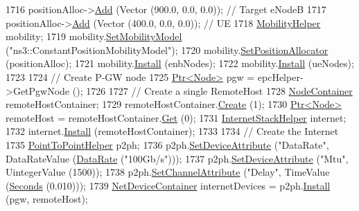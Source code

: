 \begin{DoxyCode}
1716   positionAlloc->\hyperlink{classns3_1_1ListPositionAllocator_a460e82f015ac012a73ba0ea0cccb3486}{Add} (Vector (900.0, 0.0, 0.0)); \textcolor{comment}{// Target eNodeB}
1717   positionAlloc->\hyperlink{classns3_1_1ListPositionAllocator_a460e82f015ac012a73ba0ea0cccb3486}{Add} (Vector (400.0, 0.0, 0.0)); \textcolor{comment}{// UE}
1718   \hyperlink{classns3_1_1MobilityHelper}{MobilityHelper} mobility;
1719   mobility.\hyperlink{classns3_1_1MobilityHelper_a030275011b6f40682e70534d30280aba}{SetMobilityModel} (\textcolor{stringliteral}{"ns3::ConstantPositionMobilityModel"});
1720   mobility.\hyperlink{classns3_1_1MobilityHelper_ac59d5295076be3cc11021566713a28c5}{SetPositionAllocator} (positionAlloc);
1721   mobility.\hyperlink{classns3_1_1MobilityHelper_a07737960ee95c0777109cf2994dd97ae}{Install} (enbNodes);
1722   mobility.\hyperlink{classns3_1_1MobilityHelper_a07737960ee95c0777109cf2994dd97ae}{Install} (ueNodes);
1723 
1724   \textcolor{comment}{// Create P-GW node}
1725   \hyperlink{classns3_1_1Ptr}{Ptr<Node>} pgw = epcHelper->GetPgwNode ();
1726 
1727   \textcolor{comment}{// Create a single RemoteHost}
1728   \hyperlink{classns3_1_1NodeContainer}{NodeContainer} remoteHostContainer;
1729   remoteHostContainer.\hyperlink{classns3_1_1NodeContainer_a787f059e2813e8b951cc6914d11dfe69}{Create} (1);
1730   \hyperlink{classns3_1_1Ptr}{Ptr<Node>} remoteHost = remoteHostContainer.\hyperlink{classns3_1_1NodeContainer_a9ed96e2ecc22e0f5a3d4842eb9bf90bf}{Get} (0);
1731   \hyperlink{classns3_1_1InternetStackHelper}{InternetStackHelper} internet;
1732   internet.\hyperlink{classns3_1_1InternetStackHelper_a6645b412f31283d2d9bc3d8a95cebbc0}{Install} (remoteHostContainer);
1733 
1734   \textcolor{comment}{// Create the Internet}
1735   \hyperlink{classns3_1_1PointToPointHelper}{PointToPointHelper} p2ph;
1736   p2ph.\hyperlink{classns3_1_1PointToPointHelper_a4577f5ab8c387e5528af2e0fbab1152e}{SetDeviceAttribute} (\textcolor{stringliteral}{"DataRate"}, DataRateValue (\hyperlink{classns3_1_1DataRate}{DataRate} (\textcolor{stringliteral}{"100Gb/s"})));
1737   p2ph.\hyperlink{classns3_1_1PointToPointHelper_a4577f5ab8c387e5528af2e0fbab1152e}{SetDeviceAttribute} (\textcolor{stringliteral}{"Mtu"}, UintegerValue (1500));
1738   p2ph.\hyperlink{classns3_1_1PointToPointHelper_a6b5317fd17fb61e5a53f8d66a90b63b9}{SetChannelAttribute} (\textcolor{stringliteral}{"Delay"}, TimeValue (\hyperlink{group__timecivil_ga33c34b816f8ff6628e33d5c8e9713b9e}{Seconds} (0.010)));
1739   \hyperlink{classns3_1_1NetDeviceContainer}{NetDeviceContainer} internetDevices = p2ph.\hyperlink{classns3_1_1PointToPointHelper_ab9162fea3e88722666fed1106df1f9ec}{Install} (pgw, remoteHost);

\end{DoxyCode}
